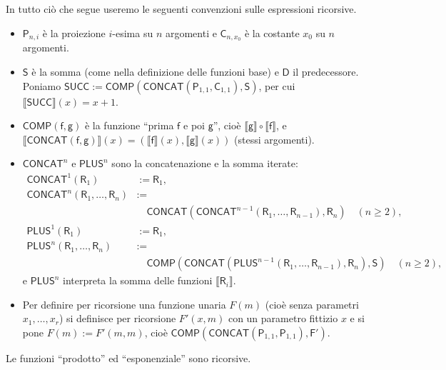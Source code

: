 \begin{rema}[Convenzioni]
In tutto ciò che segue useremo le seguenti convenzioni sulle espressioni ricorsive.
\begin{itemize}
\item $\mathsf P_{n,i}$ è la proiezione $i$-esima su $n$ argomenti e $\mathsf C_{n,x_0}$ è la costante $x_0$ su $n$ argomenti.
\item $\mathsf S$ è la somma (come nella definizione delle funzioni base) e $\mathsf D$ il predecessore. Poniamo
$\mathsf{SUCC}:=\mathsf{COMP}(\mathsf{CONCAT}(\mathsf P_{1,1},\mathsf C_{1,1}),\mathsf S)$, per cui $\llbracket\mathsf{SUCC}\rrbracket(x)=x+1$.
\item $\mathsf{COMP}(\mathsf f,\mathsf g)$ è la funzione ``prima $\mathsf f$ e poi $\mathsf g$'', cioè $\llbracket\mathsf g\rrbracket\circ\llbracket\mathsf f\rrbracket$, e
$\llbracket\mathsf{CONCAT}(\mathsf f,\mathsf g)\rrbracket(x)=(\llbracket\mathsf f\rrbracket(x),\llbracket\mathsf g\rrbracket(x))$ (stessi argomenti).
\item $\mathsf{CONCAT}^n$ e $\mathsf{PLUS}^n$ sono la concatenazione e la somma iterate:
\begin{align*}
\mathsf{CONCAT}^1(\mathsf R_1)&:=\mathsf R_1,\\
\mathsf{CONCAT}^n(\mathsf R_1,\dots,\mathsf R_n)&:=\\&\quad\mathsf{CONCAT}(\mathsf{CONCAT}^{n-1}(\mathsf R_1,\dots,\mathsf R_{n-1}),\mathsf R_n)\quad(n\ge2),\\
\mathsf{PLUS}^1(\mathsf R_1)&:=\mathsf R_1,\\
\mathsf{PLUS}^n(\mathsf R_1,\dots,\mathsf R_n)&:=\\&\quad\mathsf{COMP}(\mathsf{CONCAT}(\mathsf{PLUS}^{n-1}(\mathsf R_1,\dots,\mathsf R_{n-1}),\mathsf R_n),\mathsf S)\quad(n\ge2),
\end{align*}
e $\mathsf{PLUS}^n$ interpreta la somma delle funzioni $\llbracket\mathsf R_i\rrbracket$.
\item Per definire per ricorsione una funzione unaria $F(m)$ (cioè senza parametri $x_1,\dots,x_r$)
si definisce per ricorsione $F'(x,m)$ con un parametro fittizio $x$ e si pone $F(m):=F'(m,m)$, cioè
$\mathsf{COMP}(\mathsf{CONCAT}(\mathsf P_{1,1},\mathsf P_{1,1}),\mathsf{F'})$.
\end{itemize}
\end{rema}

\begin{lemm}
Le funzioni ``prodotto'' ed ``esponenziale'' sono ricorsive.
\end{lemm}

